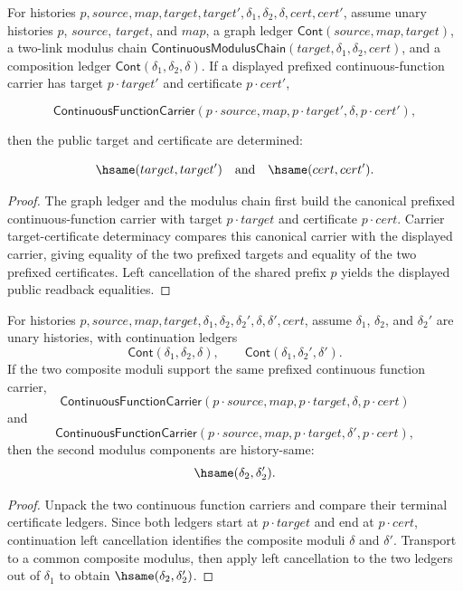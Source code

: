 \begin{theorem}
\label{thm:continuous-function-carrier-prefixed-graph-chain-public-readback}
For histories $p,source,map,target,target',\delta_1,\delta_2,\delta,cert,cert'$,
assume unary histories $p$, $source$, $target$, and $map$, a graph ledger
$\mathsf{Cont}(source,map,target)$, a two-link modulus chain
$\mathsf{ContinuousModulusChain}(target,\delta_1,\delta_2,cert)$, and a
composition ledger $\mathsf{Cont}(\delta_1,\delta_2,\delta)$. If a displayed
prefixed continuous-function carrier has target $p\cdot target'$ and
certificate $p\cdot cert'$,

$$
\mathsf{ContinuousFunctionCarrier}
(p\cdot source,map,p\cdot target',\delta,p\cdot cert'),
$$

then the public target and certificate are determined:

$$
\hsame(target,target')\quad\text{and}\quad\hsame(cert,cert').
$$
\end{theorem}
\begin{proof}
The graph ledger and the modulus chain first build the canonical prefixed
continuous-function carrier with target $p\cdot target$ and certificate
$p\cdot cert$. Carrier target-certificate determinacy compares this canonical
carrier with the displayed carrier, giving equality of the two prefixed targets
and equality of the two prefixed certificates. Left cancellation of the shared
prefix $p$ yields the displayed public readback equalities.
\end{proof}

\begin{theorem}
\label{thm:continuous-function-carrier-prefixed-graph-chain-second-deterministic}
For histories $p,source,map,target,\delta_1,\delta_2,\delta_2',\delta,
\delta',cert$, assume $\delta_1$, $\delta_2$, and $\delta_2'$ are unary
histories, with continuation ledgers
$$
\mathsf{Cont}(\delta_1,\delta_2,\delta),
\qquad
\mathsf{Cont}(\delta_1,\delta_2',\delta').
$$
If the two composite moduli support the same prefixed continuous function
carrier,
$$
\mathsf{ContinuousFunctionCarrier}(p\cdot source,map,p\cdot target,\delta,p\cdot cert)
$$
and
$$
\mathsf{ContinuousFunctionCarrier}(p\cdot source,map,p\cdot target,\delta',p\cdot cert),
$$
then the second modulus components are history-same:
$$
\hsame(\delta_2,\delta_2').
$$
\end{theorem}
\begin{proof}
Unpack the two continuous function carriers and compare their terminal
certificate ledgers. Since both ledgers start at $p\cdot target$ and end at
$p\cdot cert$, continuation left cancellation identifies the composite moduli
$\delta$ and $\delta'$. Transport to a common composite modulus, then apply
left cancellation to the two ledgers out of $\delta_1$ to obtain
$\hsame(\delta_2,\delta_2')$.
\end{proof}

